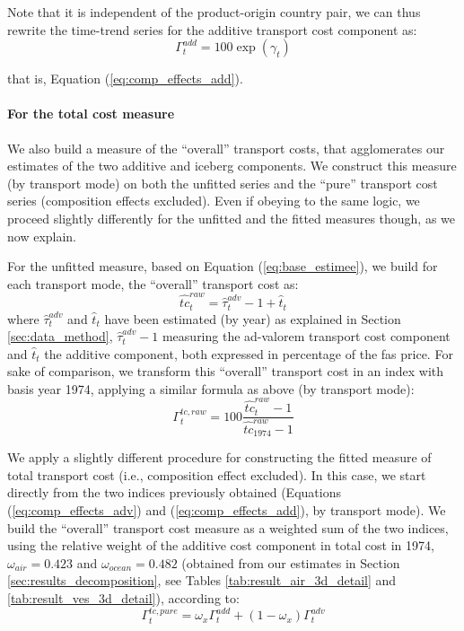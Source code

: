 \documentclass[a4paper,11pt]{article}
\begin{document}
\noindent Note that it is independent of the product-origin country pair, we can thus rewrite the time-trend series for the additive transport cost component as:
\begin{equation*}
\Gamma^{add}_t  = 100\exp(\gamma_t)
\end{equation*}

that is, Equation (\ref{eq:comp_effects_add}).

\paragraph{For the total cost measure} We also build a measure of the ``overall'' transport costs, that agglomerates our estimates of the two additive and iceberg components. We construct this measure (by transport mode) on both the unfitted series and the ``pure'' transport cost series (composition effects excluded). Even if obeying to the same logic, we proceed slightly differently for the unfitted and the fitted measures though, as we now explain.\smallskip

For the unfitted measure, based on Equation (\ref{eq:base_estimee}), we build for each transport mode, the ``overall'' transport cost as:
$$\widehat{tc}^{raw}_t= \widehat{\tau}^{adv}_t -1 + \widehat{t}_t$$
\noindent where $\widehat{\tau}^{adv}_t$ and $\widehat{t}_t$ have been estimated (by year) as explained in Section \ref{sec:data_method}, $\widehat{\tau}^{adv}_t-1$ measuring the ad-valorem transport cost component and $\widehat{t}_t$ the additive component, both expressed in percentage of the fas price. For sake of comparison, we transform this ``overall'' transport cost in an index with basis year 1974, applying a similar formula as above (by transport mode):
$$\Gamma^{tc, raw}_t = 100\frac{\widehat{tc}^{raw}_t -1 }{\widehat{tc}^{raw}_{1974}-1}$$

We apply a slightly different procedure for constructing the fitted measure of total transport cost (i.e., composition effect excluded). In this case, we start directly from the two indices previously obtained (Equations (\ref{eq:comp_effects_adv}) and (\ref{eq:comp_effects_add}), by transport mode). We build the ``overall'' transport cost measure as a weighted sum of the two indices, using the relative weight of the additive cost component in total cost in 1974, $\omega_{air}= 0.423$ and $\omega_{ocean}= 0.482$ (obtained from our estimates in Section \ref{sec:results_decomposition}, see Tables \ref{tab:result_air_3d_detail} and \ref{tab:result_ves_3d_detail}), according to:
$$\Gamma^{tc, pure}_t = \omega_{x}\Gamma^{add}_t +(1-\omega_{x})\Gamma^{adv}_t $$
\end{document}
